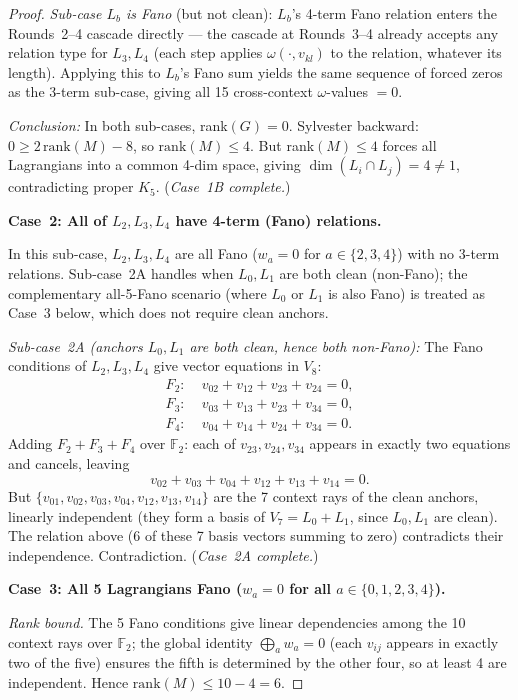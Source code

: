 \documentclass[11pt,a4paper]{article}
\theoremstyle{remark}
\begin{document}
\begin{proof}
\textit{Sub-case $L_b$ is Fano} (but not clean): $L_b$'s 4-term Fano relation enters
the Rounds~2--4 cascade directly --- the cascade at Rounds~3--4 already accepts any
relation type for $L_3, L_4$ (each step applies $\omega(\cdot, v_{kl})$ to the relation,
whatever its length). Applying this to $L_b$'s Fano sum yields the same sequence of
forced zeros as the 3-term sub-case, giving all 15 cross-context $\omega$-values $= 0$.

\textit{Conclusion:} In both sub-cases, rank$(G) = 0$.
Sylvester backward: $0 \geq 2\,\mathrm{rank}(M) - 8$, so $\mathrm{rank}(M) \leq 4$.
But rank$(M) \leq 4$ forces all Lagrangians into a common 4-dim space, giving
$\dim(L_i \cap L_j) = 4 \neq 1$, contradicting proper $K_5$. \quad (\textit{Case~1B complete.})

\medskip
\noindent\textbf{Case~2: All of $L_2, L_3, L_4$ have 4-term (Fano) relations.}

In this sub-case, $L_2, L_3, L_4$ are all Fano ($w_a = 0$ for $a \in \{2,3,4\}$)
with no 3-term relations.
Sub-case~2A handles when $L_0, L_1$ are both clean (non-Fano);
the complementary all-5-Fano scenario (where $L_0$ or $L_1$ is also Fano)
is treated as Case~3 below, which does not require clean anchors.

\textit{Sub-case~2A (anchors $L_0, L_1$ are both clean, hence both non-Fano):}
The Fano conditions of $L_2, L_3, L_4$ give vector equations in $V_8$:
\begin{align*}
  F_2{:}\; & v_{02} + v_{12} + v_{23} + v_{24} = 0, \\
  F_3{:}\; & v_{03} + v_{13} + v_{23} + v_{34} = 0, \\
  F_4{:}\; & v_{04} + v_{14} + v_{24} + v_{34} = 0.
\end{align*}
Adding $F_2 + F_3 + F_4$ over $\mathbb{F}_2$: each of $v_{23}, v_{24}, v_{34}$
appears in exactly two equations and cancels, leaving
\[
  v_{02} + v_{03} + v_{04} + v_{12} + v_{13} + v_{14} = 0.
\]
But $\{v_{01}, v_{02}, v_{03}, v_{04}, v_{12}, v_{13}, v_{14}\}$ are the 7 context rays
of the clean anchors, linearly independent (they form a basis of $V_7 = L_0 + L_1$,
since $L_0, L_1$ are clean).
The relation above (6 of these 7 basis vectors summing to zero) contradicts their
independence. Contradiction. \quad (\textit{Case~2A complete.})

\medskip
\noindent\textbf{Case~3: All 5 Lagrangians Fano ($w_a = 0$ for all $a \in \{0,1,2,3,4\}$).}

\textit{Rank bound.}
The 5 Fano conditions give linear dependencies among the 10 context rays over
$\mathbb{F}_2$; the global identity $\bigoplus_a w_a = 0$ (each $v_{ij}$ appears
in exactly two of the five) ensures the fifth is determined by the other four,
so at least 4 are independent.
Hence $\mathrm{rank}(M) \leq 10 - 4 = 6$.


\end{proof}
\end{document}
